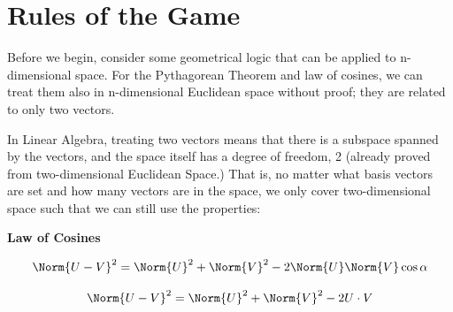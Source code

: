 \documentclass[../main.tex]{subfiles}
\begin{document}
\section{Rules of the Game}

\quad Before we begin, consider some geometrical logic that can be applied to n-dimensional space. For the Pythagorean Theorem and law of cosines, we can treat them also in n-dimensional Euclidean space without proof; they are related to only two vectors. 

In Linear Algebra, treating two vectors means that there is a subspace spanned by the vectors, and the space itself has a degree of freedom, 2 (already proved from two-dimensional Euclidean Space.) That is, no matter what basis vectors are set and how many vectors are in the space, we only cover two-dimensional space such that we can still use the properties:

\begin{center}
\end{center}

\textbf{Law of Cosines}

\begin{center}
    \begin{equation}
        \Norm{U-V}^2=\Norm{U}^2+\Norm{V}^2-2\Norm{U}\Norm{V}\cos{\alpha}
    \end{equation}
\end{center}

\begin{center}
    \begin{equation}
        \Norm{U-V}^2=\Norm{U}^2+\Norm{V}^2-2U\cdot V
    \end{equation}
\end{center}
\end{document}
